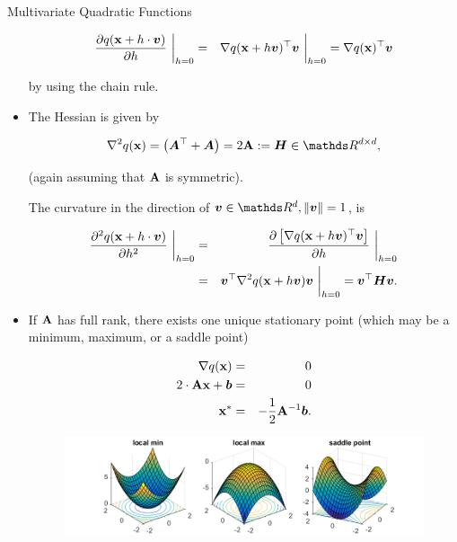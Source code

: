 \begin{vbframe}{Multivariate Quadratic Functions}
\begin{itemize}
    \begin{eqnarray*}
      \frac{\partial q(\mathbf{x} + h \cdot \bm{v})}{\partial h}~\bigg\rvert_{h = 0} &=& \nabla q(\mathbf{x} + h \bm{v})^\top \bm{v}~\bigg\rvert_{h = 0} = \nabla q(\mathbf{x})^\top \bm{v}
    \end{eqnarray*}
  
    by using the chain rule.
  
    \item The Hessian is given by 
  
    \begin{eqnarray*}
      \nabla^2 q(\xv) = \left(\bm{A}^\top + \bm{A}\right) = 2 \Amat := \bm{H} \in \R^{d \times d},
    \end{eqnarray*}
  
    (again assuming that $\mathbf{A}$ is symmetric). 
  
    \vspace*{0.2cm}
  
    The curvature in the direction of $\bm{v}\in \R^d, \|\bm{v}\| = 1$, is
  
    \begin{eqnarray*}
      \frac{\partial^2 q(\mathbf{x} + h \cdot \bm{v})}{\partial h^2}~\bigg\rvert_{h = 0} &=& \frac{\partial \left[\nabla q(\mathbf{x} + h \bm{v})^\top\bm{v}\right]}{\partial h}~\bigg\rvert_{h = 0} \\ &=& \bm{v}^\top \nabla^2 q(\mathbf{x} + h \bm{v}) \bm{v}~\bigg\rvert_{h = 0} = \bm{v}^\top \bm{H} \bm{v}.
    \end{eqnarray*}
  
  
    \item If $\mathbf{A}$ has full rank, there exists one unique stationary point (which may be a minimum, maximum, or a saddle point) 
  
    \begin{eqnarray*}
      \nabla q(\mathbf{x}) &=& 0 \\
      2 \cdot \mathbf{A} \mathbf{x} + \bm{b} &=& 0 \\
      \mathbf{x}^\ast &=& - \frac{1}{2} \mathbf{A}^{-1} \bm{b}.
    \end{eqnarray*}  
  
  
  \begin{figure}
    \includegraphics{figure_man/minmaxsaddle.png}\\
    \begin{footnotesize} 
    \end{footnotesize}
  \end{figure}
  

\end{itemize}
\end{vbframe}
